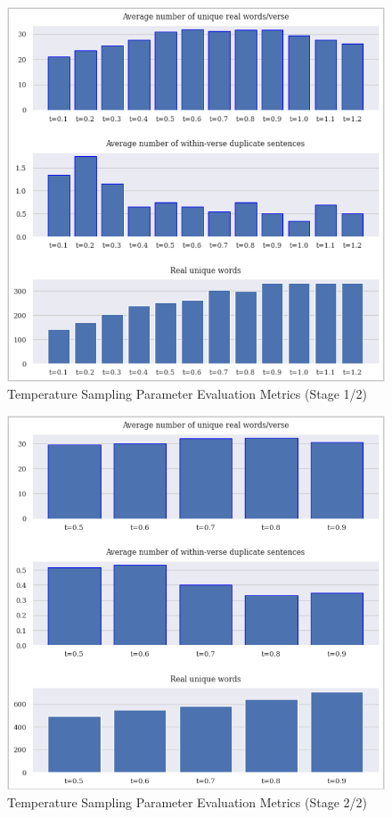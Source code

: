 \pagebreak

\label{apdx:figures}

\begin{figure}[h]
    \centering
    \includegraphics[scale=0.70, keepaspectratio=true]{figures/temp_param_eval_s1.png}
    \caption{Temperature Sampling Parameter Evaluation Metrics (Stage 1/2)}
    \label{fig:temp-param-eval-1}
\end{figure}

\begin{figure}[h]
    \includegraphics[width=\textwidth, height=\textheight,keepaspectratio=true]{figures/temp_param_eval_s2.png}
    \caption{Temperature Sampling Parameter Evaluation Metrics (Stage 2/2)}
    \label{fig:temp-param-eval-2}
\end{figure}

